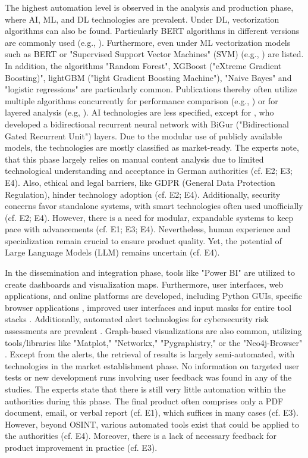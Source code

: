 \documentclass[10pt]{article}
\begin{document}
The highest automation level is observed in the analysis and production phase, where AI, ML, and DL technologies are prevalent.
Under DL, vectorization algorithms can also be found. Particularly BERT algorithms in different versions are commonly used
(e.g., \cite{Ma.2022}). Furthermore, even under ML vectorization models such as BERT or
"Supervised Support Vector Machines" (SVM) (e.g., \cite{Iorga.2020}) are listed.
In addition, the algorithms "Random Forest", XGBoost ("eXtreme Gradient Boosting)",
lightGBM ("light Gradient Boosting Machine"), "Naive Bayes" and "logistic regressions" are particularly common.
Publications thereby often utilize multiple algorithms concurrently for performance comparison (e.g., \cite{Tao.2023})
or for layered analysis (e.g, \cite{Yang.2022}). AI technologies are less specified,
except for \cite{Dale.2023}, who developed a bidirectional recurrent neural network with
BiGur ("Bidirectional Gated Recurrent Unit") layers. Due to the modular use of publicly available models,
the technologies are mostly classified as market-ready. The experts note, that this phase largely relies
on manual content analysis due to limited technological understanding and acceptance in German authorities
(cf. E2; E3; E4). Also, ethical and legal barriers, like GDPR (General Data Protection Regulation), hinder technology
adoption (cf. E2; E4). Additionally, security concerns favor standalone systems,
with smart technologies often used unofficially (cf. E2; E4). However, there is a need for modular,
expandable systems to keep pace with advancements (cf. E1; E3; E4). Nevertheless, human experience
and specialization remain crucial to ensure product quality. Yet, the potential of Large Language Models (LLM) remains uncertain (cf. E4).

In the dissemination and integration phase, tools like "Power BI" \cite{Tao.2023}
are utilized to create dashboards and visualization maps. Furthermore, user interfaces,
web applications, and online platforms are developed, including Python GUIs,
specific browser applications \cite{Elmas.2022},
improved user interfaces and input masks for entire tool stacks \cite{Arjun.2020}.
Additionally, automated alert technologies for cybersecurity risk assessments are prevalent \cite{Ahuja.2022}. Graph-based visualizations are also common, utilizing tools/libraries like "Matplot," "Networkx," "Pygraphistry," or the "Neo4j-Browser" \cite{Middleton.2020}.
Except from the alerts, the retrieval of results is largely semi-automated, with technologies in the market establishment phase. No information on targeted user tests or new development runs involving user feedback was found in any of the studies. The experts state that there is still very little
automation within the authorities during this phase. The final product often comprises only a PDF document, email, or verbal report (cf. E1), which suffices in many cases (cf. E3).
However, beyond OSINT, various automated tools exist that could be applied to the authorities (cf. E4). Moreover, there is a lack of necessary feedback for product improvement in practice (cf. E3).
\end{document}
